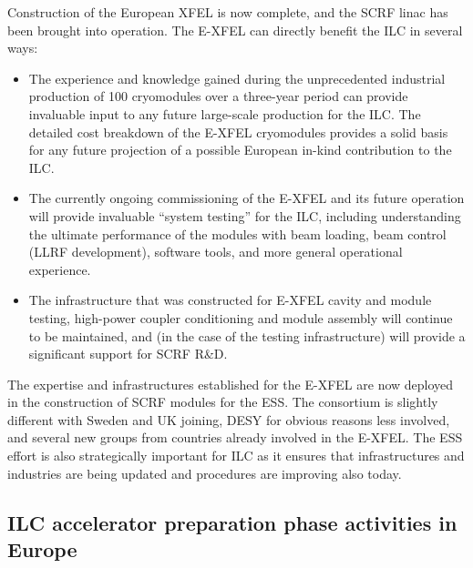 \documentclass[%
 reprint,
 amsmath,amssymb,
 aps,
]{revtex4-1}
\begin{document}
Construction of the European XFEL is now complete, and the SCRF linac has been brought into operation. The E-XFEL can directly benefit the ILC in several ways: 
\begin{itemize}
\item The experience and knowledge gained during the unprecedented industrial
production of 100 cryomodules over a three-year period can provide 
invaluable input to any future large-scale production for the ILC. The detailed cost breakdown of the E-XFEL cryomodules 
provides a solid basis for any future projection of a possible European in-kind contribution to the ILC. 
\item 
The currently ongoing commissioning of the E-XFEL and its future operation will provide invaluable ``system testing'' for the ILC, 
including understanding the ultimate performance of the modules with beam loading, beam control (LLRF development), software tools, 
and more general operational experience. 
\item The infrastructure that was constructed for E-XFEL cavity and module 
testing, high-power coupler conditioning and module assembly will continue to be maintained, and (in the case of the testing infrastructure) will provide a significant support for SCRF R\&D.
\end{itemize}

The expertise and infrastructures established for the E-XFEL are now deployed in the construction of SCRF modules for the ESS. 
The consortium is slightly different with Sweden and UK joining, DESY for obvious reasons less involved, and several new groups from countries already 
involved in the E-XFEL. The ESS effort is also strategically important for ILC as it ensures that infrastructures and industries 
are being updated and procedures are improving also today.

\subsection{ILC accelerator preparation phase activities in Europe ~\label{sec:acc:prephase}}
\end{document}
